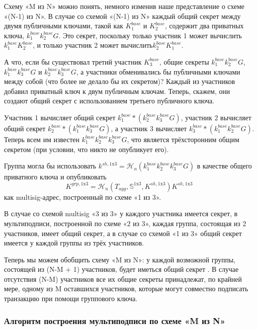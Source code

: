 Схему «M из N» можно понять, немного изменив наше представление о схеме «(N-1) из N». В случае со схемой «(N-1) из N» каждый общий секрет между двумя публичными ключами, такой как $K^{base}_1$ и $K^{base}_2$, содержит два приватных ключа, $k^{base}_1 k^{base}_2 G$. Это секрет, поскольку только участник 1 может вычислить $k^{base}_1 K^{base}_2$, и только участник 2 может вычислить\linebreak $k^{base}_2 K^{base}_1$.

А что, если бы существовал третий участник $K^{base}_3$, общие секреты $k^{base}_1 k^{base}_2 G$, $k^{base}_1 k^{base}_3 G$ и $k^{base}_2 k^{base}_3 G$, а участники обменивались бы публичными ключами между собой (что более не делало бы их секретом)? Каждый из участников добавил приватный ключ к двум публичным ключам. Теперь, скажем, они создают общий секрет с использованием третьего публичного ключа.

Участник 1 вычисляет общий секрет $k^{base}_1*(k^{base}_2 k^{base}_3 G)$, участник 2 вычисляет общий секрет $k^{base}_2*(k^{base}_1 k^{base}_3 G)$, а участник 3 вычисляет $k^{base}_3*(k^{base}_1 k^{base}_2 G)$. Теперь всем им известен $k^{base}_1 k^{base}_2 k^{base}_3 G$, что является трёхсторонним общим секретом (при условии, что никто не опубликует его).

Группа могла бы использовать $k^{sh,\textrm{1x3}} = \mathcal{H}_n(k^{base}_1 k^{base}_2 k^{base}_3 G)$ в качестве общего приватного ключа и опубликовать\vspace{.155cm} \[K^{grp,\textrm{1x3}} = \mathcal{H}_n(T_{agg},\mathbb{S}^{\textrm{1x3}},K^{sh,\textrm{1x3}}) K^{sh,\textrm{1x3}}\] как multisig-адрес, построенный по схеме «1 из 3».

В случае со схемой multisig «3 из 3» у каждого участника имеется секрет, в мультиподписи, построенной по схеме «2 из 3», каждая группа, состоящая из 2 участников, имеет общий секрет, а в случае со схемой «1 из 3» общий секрет имеется у каждой группы из трёх участников.

Теперь мы можем обобщить схему «M из N»: у каждой возможной группы, состоящей из (N-M + 1) участников, будет иметься общий секрет \cite{old-multisig-mrl-note}. В случае отсутствия (N-M) участников все их общие секреты принадлежат, по крайней мере, одному из M оставшихся участников, которые могут совместно подписать транзакцию при помощи группового ключа.

\subsubsection*{Алгоритм построения мультиподписи по схеме «M из N»}

